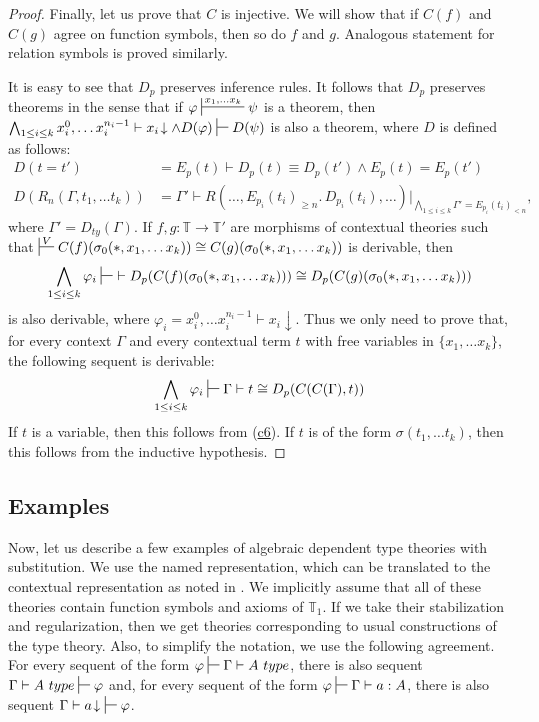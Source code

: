 \documentclass[reqno]{amsart}
\newcommand{\axref}[1]{(\hyperref[ax:#1]{#1})}
\theoremstyle{definition}
\theoremstyle{remark}
\newcommand{\deq}{\equiv}
\newcommand{\emptyCtx}{*}
\numberwithin{figure}{section}
\begin{document}
\begin{proof}
Finally, let us prove that $C$ is injective.
We will show that if $C(f)$ and $C(g)$ agree on function symbols, then so do $f$ and $g$.
Analogous statement for relation symbols is proved similarly.

It is easy to see that $D_p$ preserves inference rules.
It follows that $D_p$ preserves theorems in the sense that if $\varphi \sststile{}{x_1, \ldots x_k} \psi$ is a theorem,
then $\bigwedge_{1 \leq i \leq k} x_i^0, \ldots x_i^{n_i-1} \vdash x_i\!\downarrow \land D(\varphi) \sststile{}{} D(\psi)$ is also a theorem, where $D$ is defined as follows:
\begin{align*}
D(t = t') & = E_p(t) \vdash D_p(t) \deq D_p(t') \land E_p(t) = E_p(t') \\
D(R_n(\Gamma, t_1, \ldots t_k)) & = \Gamma' \vdash R(\ldots, E_{p_i}(t_i)_{\geq n}.\,D_{p_i}(t_i), \ldots)|_{\bigwedge_{1 \leq i \leq k} \Gamma' = E_{p_i}(t_i)_{<n}},
\end{align*}
where $\Gamma' = D_{ty}(\Gamma)$.
If $f,g : \mathbb{T} \to \mathbb{T}'$ are morphisms of contextual theories such that $\sststile{}{V} C(f)(\sigma_0(\emptyCtx, x_1, \ldots x_k)) \cong C(g)(\sigma_0(\emptyCtx, x_1, \ldots x_k))$ is derivable, then
\[ \bigwedge_{1 \leq i \leq k} \varphi_i \sststile{}{}\ \vdash D_p(C(f)(\sigma_0(\emptyCtx, x_1, \ldots x_k))) \cong D_p(C(g)(\sigma_0(\emptyCtx, x_1, \ldots x_k))) \]
is also derivable, where $\varphi_i = x_i^0, \ldots x_i^{n_i-1} \vdash x_i\!\downarrow$.
Thus we only need to prove that, for every context $\Gamma$ and every contextual term $t$ with free variables in $\{ x_1, \ldots x_k \}$, the following sequent is derivable:
\[ \bigwedge_{1 \leq i \leq k} \varphi_i \sststile{}{} \Gamma \vdash t \cong D_p(C(C(\Gamma),t)) \]
If $t$ is a variable, then this follows from \axref{c6}.
If $t$ is of the form $\sigma(t_1, \ldots t_k)$, then this follows from the inductive hypothesis.
\end{proof}

\subsection{Examples}

Now, let us describe a few examples of algebraic dependent type theories with substitution.
We use the named representation, which can be translated to the contextual representation as noted in .
We implicitly assume that all of these theories contain function symbols and axioms of $\mathbb{T}_1$.
If we take their stabilization and regularization, then we get theories corresponding to usual constructions of the type theory.
Also, to simplify the notation, we use the following agreement.
For every sequent of the form $\varphi \sststile{}{} \Gamma \vdash A\ type$, there is also sequent $\Gamma \vdash A\ type \sststile{}{} \varphi$
and, for every sequent of the form $\varphi \sststile{}{} \Gamma \vdash a : A$, there is also sequent $\Gamma \vdash a\!\downarrow\ \sststile{}{} \varphi$.
\end{document}
